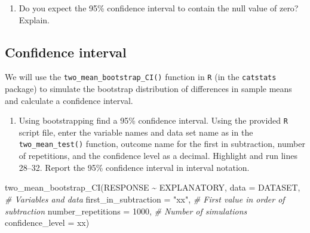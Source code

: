 \documentclass[
]{report}
\newenvironment{Shaded}{\begin{snugshade}}{\end{snugshade}}
\newcommand{\AttributeTok}[1]{\textcolor[rgb]{0.77,0.63,0.00}{#1}}
\newcommand{\CommentTok}[1]{\textcolor[rgb]{0.56,0.35,0.01}{\textit{#1}}}
\newcommand{\DecValTok}[1]{\textcolor[rgb]{0.00,0.00,0.81}{#1}}
\newcommand{\FunctionTok}[1]{\textcolor[rgb]{0.00,0.00,0.00}{#1}}
\newcommand{\NormalTok}[1]{#1}
\newcommand{\SpecialCharTok}[1]{\textcolor[rgb]{0.00,0.00,0.00}{#1}}
\newcommand{\StringTok}[1]{\textcolor[rgb]{0.31,0.60,0.02}{#1}}
\providecommand{\tightlist}{%
  \setlength{\itemsep}{0pt}\setlength{\parskip}{0pt}}
\begin{document}
\vspace{0.8in}

\begin{enumerate}
\def\labelenumi{\arabic{enumi}.}
\setcounter{enumi}{11}
\tightlist
\item
  Do you expect the 95\% confidence interval to contain the null value of zero? Explain.
\end{enumerate}

\vspace{0.8in}

\hypertarget{confidence-interval-1}{%
\subsection*{Confidence interval}\label{confidence-interval-1}}

We will use the \texttt{two\_mean\_bootstrap\_CI()} function in \texttt{R} (in the \texttt{catstats} package) to simulate the bootstrap distribution of differences in sample means and calculate a confidence interval.

\begin{enumerate}
\def\labelenumi{\arabic{enumi}.}
\setcounter{enumi}{12}
\tightlist
\item
  Using bootstrapping find a 95\% confidence interval. Using the provided \texttt{R} script file, enter the variable names and data set name as in the \texttt{two\_mean\_test()} function, outcome name for the first in subtraction, number of repetitions, and the confidence level as a decimal. Highlight and run lines 28--32. Report the 95\% confidence interval in interval notation.
\end{enumerate}

\begin{Shaded}
\begin{Highlighting}[]
\FunctionTok{two\_mean\_bootstrap\_CI}\NormalTok{(RESPONSE }\SpecialCharTok{\textasciitilde{}}\NormalTok{ EXPLANATORY, }
                      \AttributeTok{data =}\NormalTok{ DATASET,  }\CommentTok{\# Variables and data}
                      \AttributeTok{first\_in\_subtraction =} \StringTok{"xx"}\NormalTok{, }\CommentTok{\# First value in order of subtraction}
                      \AttributeTok{number\_repetitions =} \DecValTok{1000}\NormalTok{,  }\CommentTok{\# Number of simulations}
                      \AttributeTok{confidence\_level =}\NormalTok{ xx)}
\end{Highlighting}
\end{Shaded}
\end{document}
